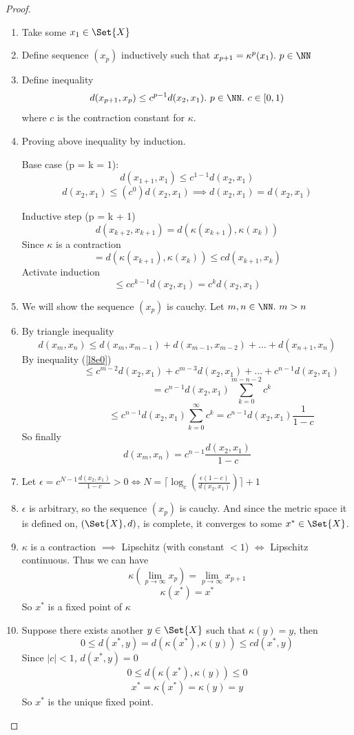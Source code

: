 \begin{proof}
  \begin{enumerate}
  \item Take some $x_1 \in \Set{X}$
  \item Define sequence $(x_p)$ inductively such that $x_{p+1} = \kappa^p(x_1).\ p \in \NN$
  \item Define inequality
    \begin{equation}
      \label{l8e0}
      d(x_{p+1}, x_p) \leq c^{p-1}d(x_2, x_1).\ p \in \NN.\ c \in [0, 1)
    \end{equation}
    where $c$ is the contraction constant for $\kappa$. 
  \item Proving above inequality by induction.
    \par Base case (p = k = 1):
    $$d(x_{1+1}, x_1) \leq c^{1-1}d(x_2, x_1)$$
    $$d(x_2, x_1) \leq (c^0)d(x_2, x_1) \implies d(x_2, x_1) = d(x_2, x_1)$$
    \par Inductive step (p = k + 1)
    $$d(x_{k+2}, x_{k+1}) = d(\kappa(x_{k+1}), \kappa(x_{k}))$$
    Since $\kappa$ is a contraction
    $$ = d(\kappa(x_{k+1}), \kappa(x_k)) \leq cd(x_{k+1}, x_k)$$
    Activate induction
    $$ \leq cc^{k-1}d(x_2, x_1) = c^kd(x_2, x_1)$$
  \item We will show the sequence $(x_p)$ is cauchy. Let $m, n \in \NN.\ m > n$
  \item By triangle inequality
    $$d(x_m, x_n) \leq d(x_m, x_{m-1}) + d(x_{m-1}, x_{m-2}) + \dots + d(x_{n+1}, x_n)$$
    By inequality (\ref{l8e0})
    $$\phantom{d(x_m, x_n) } \leq c^{m-2}d(x_2, x_1)+c^{m-3}d(x_2, x_1)+\dots + c^{n-1}d(x_2, x_1)$$
    $$\phantom{d(x_m, x_n) } = c^{n-1}d(x_2, x_1)\sum_{k=0}^{m-n-2}c^k$$
    $$\phantom{d(x_m, x_n) } \leq c^{n-1}d(x_2, x_1)\sum_{k=0}^{\infty}c^k = c^{n-1}d(x_2, x_1)\frac{1}{1-c}$$
    So finally
    $$d(x_m, x_n) = c^{n-1}\frac{d(x_2, x_1)}{1-c}$$
  \item Let $\epsilon = c^{N-1}\frac{d(x_2, x_1)}{1-c} > 0 \iff N = \lceil \log_c(\frac{\epsilon(1-c)}{d(x_2, x_1)})\rceil + 1$
  \item $\epsilon$ is arbitrary, so the sequence $(x_p)$ is cauchy. And since the metric space it is defined on, $(\Set{X}, d)$, is complete, it converges to some $x^* \in \Set{X}$.
  \item $\kappa$ is a contraction $\implies$ Lipschitz (with constant $< 1$) $\iff$ Lipschitz continuous. Thus we can have
    $$\kappa(\lim_{p\rightarrow \infty}x_p) = \lim_{p\rightarrow \infty}x_{p+1}$$
    $$\kappa(x^*) = x^*$$
    So $x^*$ is a fixed point of $\kappa$
  \item Suppose there exists another $y \in \Set{X}$ such that $\kappa(y) = y$, then
    $$0 \leq d(x^*, y) = d(\kappa(x^*), \kappa(y)) \leq cd(x^*, y)$$
    Since $|c| < 1$, $d(x^*, y) = 0$
    $$0 \leq d(\kappa(x^*), \kappa(y)) \leq 0$$
    $$x^* = \kappa(x^*) = \kappa(y) = y$$
    So $x^*$ is the unique fixed point.
  \end{enumerate}
\end{proof}


